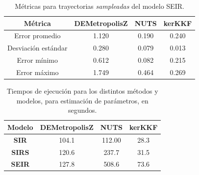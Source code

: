 \begin{table}[h!]
    \centering
    \begin{tabular}{|c|c|c|c|}
\hline
\textbf{Métrica} & \textbf{DEMetropolisZ} & \textbf{NUTS} & \textbf{kerKKF} \\
\hline
Error promedio & 1.120 & 0.190 & 0.240 \\
\hline
Desviación estándar & 0.280 & 0.079 & 0.013 \\
\hline
Error mínimo & 0.612 & 0.082 & 0.215 \\
\hline
Error máximo & 1.749 & 0.464 & 0.269 \\
\hline
\end{tabular}
    \caption{Métricas para trayectorias \textit{sampleadas} del modelo SEIR.}
    \label{tab:metricas_traj_SEIR}
\end{table}


\begin{table}[h!]
    \centering
    \caption{Tiempos de ejecución para los distintos métodos y modelos, para estimación de parámetros, en segundos.} 
    \begin{tabular}{|c|c|c|c|}
    \hline
    \textbf{Modelo} & \textbf{DEMetropolisZ} & \textbf{NUTS} & \textbf{kerKKF}  \\ \hline
    \textbf{SIR} & 104.1 & 112.00 & 28.3 \\ \hline
    \textbf{SIRS} & 120.6 & 237.7 & 31.5 \\ \hline
    \textbf{SEIR} & 127.8 & 508.6 & 73.6 \\ \hline
    \end{tabular}
    \label{tab:ex_times}
\end{table}
